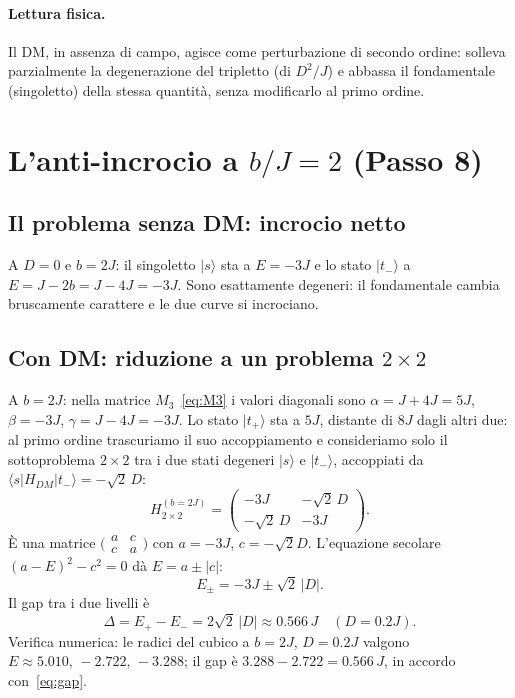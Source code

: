 \documentclass[11pt,a4paper]{article}
\newcommand{\ket}[1]{\lvert #1 \rangle}
\newcommand{\melem}[3]{\langle #1 \vert #2 \vert #3 \rangle}
\theoremstyle{definition}
\begin{document}
\paragraph{Lettura fisica.} Il DM, in assenza di campo, agisce come perturbazione di secondo ordine:
solleva parzialmente la degenerazione del tripletto (di $D^2/J$) e abbassa il fondamentale (singoletto)
della stessa quantità, senza modificarlo al primo ordine.

\FloatBarrier
\section{L'anti-incrocio a $b/J=2$ (Passo 8)}

\subsection{Il problema senza DM: incrocio netto}

A $D=0$ e $b=2J$: il singoletto $\ket{s}$ sta a $E=-3J$ e lo stato $\ket{t_-}$ a $E=J-2b=J-4J=-3J$.
Sono esattamente degeneri: il fondamentale cambia bruscamente carattere e le due curve si incrociano.

\subsection{Con DM: riduzione a un problema $2\times2$}

A $b=2J$: nella matrice $M_3$~\eqref{eq:M3} i valori diagonali sono
$\alpha=J+4J=5J$, $\beta=-3J$, $\gamma=J-4J=-3J$.
Lo stato $\ket{t_+}$ sta a $5J$, distante di $8J$ dagli altri due: al primo ordine trascuriamo il
suo accoppiamento e consideriamo solo il sottoproblema $2\times2$ tra i due stati degeneri $\ket{s}$
e $\ket{t_-}$, accoppiati da $\melem{s}{H_{DM}}{t_-}=-\sqrt2\,D$:
\begin{equation}
H_{2\times2}^{(b=2J)}=\begin{pmatrix}-3J & -\sqrt{2}\,D\\ -\sqrt{2}\,D & -3J\end{pmatrix}.
\label{eq:H2x2}
\end{equation}
È una matrice $\bigl(\begin{smallmatrix}a&c\\c&a\end{smallmatrix}\bigr)$ con $a=-3J$, $c=-\sqrt2 D$.
L'equazione secolare $(a-E)^2-c^2=0$ dà $E=a\pm|c|$:
\begin{equation}
E_\pm=-3J\pm\sqrt{2}\,|D|.
\label{eq:Eanti}
\end{equation}
Il gap tra i due livelli è
\begin{equation}
\boxed{\Delta=E_+-E_-=2\sqrt{2}\,|D|\approx0.566\,J\quad(D=0.2J).}
\label{eq:gap}
\end{equation}
Verifica numerica: le radici del cubico a $b=2J$, $D=0.2J$ valgono
$E\approx5.010,\,-2.722,\,-3.288$; il gap è $3.288-2.722=0.566\,J$, in accordo con~\eqref{eq:gap}.
\end{document}
